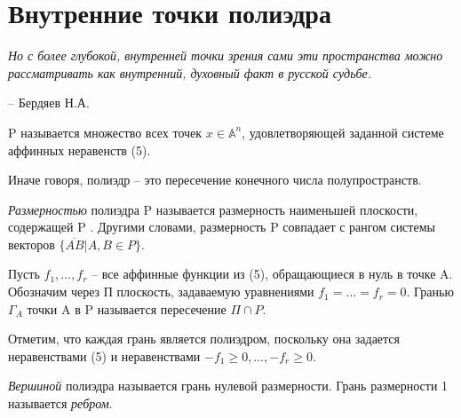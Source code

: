 \chapter{Внутренние точки полиэдра}
\label{cha:9}

\epigraph{
	\textit{Но с более глубокой, внутренней точки зрения сами эти пространства можно рассматривать как внутренний, духовный факт в русской судьбе.}}
{-- Бердяев Н.А.}

\begin{definition}\label{cha:9/def:1}
	 P называется множество всех точек $x \in \mathbb{A}^n$, удовлетворяющей заданной системе аффинных неравенств (5).
\end{definition}

Иначе говоря, полиэдр – это пересечение конечного числа полупространств. 

\textit{Размерностью} полиэдра P называется размерность наименьшей плоскости, содержащей P . Другими словами, размерность P совпадает с рангом системы векторов $\{ \overline{AB} | A, B \in P \}$. 

Пусть $f_1, \dots, f_r$ – все аффинные функции из (5), обращающиеся в нуль в точке A. Обозначим через П плоскость, задаваемую уравнениями $f_1 = \dots = f_r = 0$. Гранью $\Gamma_A$ точки A в P называется пересечение $\Pi \cap P$.

Отметим, что каждая грань является полиэдром, поскольку она задается неравенствами (5) и неравенствами $−f_1 \ge 0, \dots, −f_r \ge 0$.

\begin{definition}\label{cha:9/def:2}
	\textit{Вершиной} полиэдра называется грань нулевой размерности. Грань размерности 1 называется \textit{ребром}.
\end{definition}

